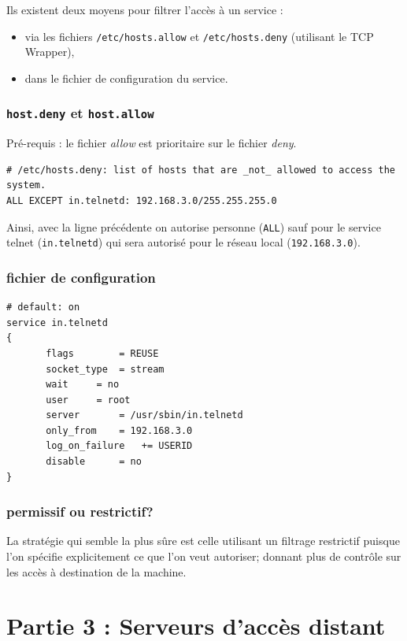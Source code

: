\documentclass[12pt,a4paper,notitlepage]{article}
\begin{document}
Ils existent deux moyens pour filtrer l'accès à un service : 
\begin{itemize}
\item via les fichiers \texttt{/etc/hosts.allow} et \texttt{/etc/hosts.deny} (utilisant le TCP Wrapper),
\item dans le fichier de configuration du service.
\end{itemize}

\subsubsection{\texttt{host.deny} et \texttt{host.allow}}

\noindent Pré-requis : le fichier \textit{allow} est prioritaire sur le fichier \textit{deny}.\\

\begin{lstlisting}
# /etc/hosts.deny: list of hosts that are _not_ allowed to access the system.
ALL EXCEPT in.telnetd: 192.168.3.0/255.255.255.0
\end{lstlisting}
Ainsi, avec la ligne précédente on autorise personne (\texttt{ALL}) sauf pour le service telnet (\texttt{in.telnetd}) qui sera autorisé pour le réseau local (\texttt{192.168.3.0}).


\subsubsection{fichier de configuration}

\begin{lstlisting}
# default: on
service in.telnetd
{
       flags		= REUSE
       socket_type	= stream
       wait		= no
       user		= root
       server		= /usr/sbin/in.telnetd
       only_from	= 192.168.3.0
       log_on_failure	+= USERID
       disable		= no
}
\end{lstlisting}

\subsubsection{permissif ou restrictif?}



La stratégie qui semble la plus sûre est celle utilisant un filtrage restrictif puisque l'on spécifie explicitement ce que l'on veut autoriser; donnant plus de contrôle sur les accès à destination de la machine.


\section{Partie 3 : Serveurs d'accès distant}
\end{document}
